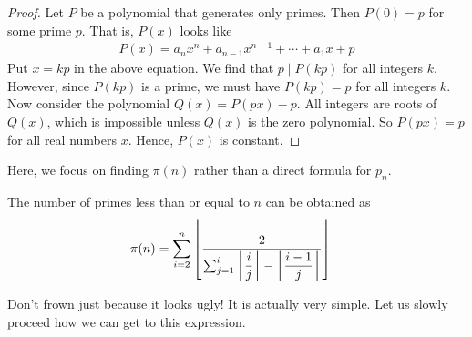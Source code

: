 		\begin{proof}
			Let $P$ be a polynomial that generates only primes. Then $P(0)=p$ for some prime $p$. That is, $P(x)$ looks like
				\begin{align*}
				P(x)=a_nx^n+a_{n-1}x^{n-1} + \cdots + a_1x + p
				\end{align*}
			Put $x=kp$ in the above equation. We find that $p\mid P(kp)$ for all integers $k$. However, since $P(kp)$ is a prime, we must have $P(kp)=p$ for all integers $k$. Now consider the polynomial $Q(x)=P(px)-p$. All integers are roots of $Q(x)$, which is impossible unless $Q(x)$ is the zero polynomial. So $P(px)=p$ for all real numbers $x$. Hence, $P(x)$ is constant.
		\end{proof}
	Here, we focus on finding $\pi(n)$ rather than a direct formula for $p_n$.
		\begin{theorem}[]
			The number of primes less than or equal to $n$ can be obtained as
				\begin{align*}
					\pi(n) & =
						\sum_{i=2}^{n}\left\lfloor{\dfrac{2}{\sum_{j=1}^{i}\left\lfloor{\dfrac{i}{j}}\right\rfloor-\left\lfloor{\dfrac{i-1}{j}}\right\rfloor}}\right\rfloor
				\end{align*}
		\end{theorem}
	Don't frown just because it looks ugly! It is actually very simple. Let us slowly proceed how we can get to this expression.
